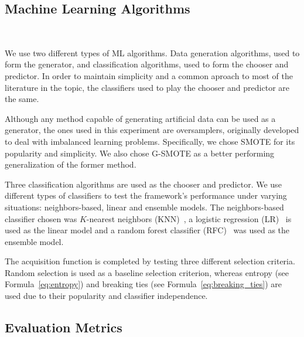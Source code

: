 \documentclass[parskip=full]{scrartcl}
\begin{document}

\subsection{Machine Learning Algorithms}~\label{sec:machine_learning_algorithms}

We use two different types of ML algorithms. Data generation algorithms, used to
form the generator, and classification algorithms, used to form the chooser and
predictor. In order to maintain simplicity and a common aproach to most of the
literature in the topic, the classifiers used to play the chooser and predictor
are the same.

Although any method capable of generating artificial data can be used as a
generator, the ones used in this experiment are oversamplers, originally
developed to deal with imbalanced learning problems. Specifically, we chose
SMOTE for its popularity and simplicity. We also chose G-SMOTE as a better
performing generalization of the former method.

Three classification algorithms are used as the chooser and predictor. We use
different types of classifiers to test the framework's performance under varying
situations: neighbors-based, linear and ensemble models. The neighbors-based
classifier chosen was $K$-nearest neighbors (KNN)~\cite{Cover1967}, a logistic
regression (LR)~\cite{Nelder1972} is used as the linear model and a random
forest classifier (RFC)~\cite{Ho1995} was used as the ensemble model.

The acquisition function is completed by testing three different selection
criteria. Random selection is used as a baseline selection criterion, whereas
entropy (see Formula~\ref{eq:entropy}) and breaking ties (see
Formula~\ref{eq:breaking_ties}) are used due to their popularity and classifier
independence. 

\subsection{Evaluation Metrics}~\label{sec:evaluation_metrics}
\end{document}
